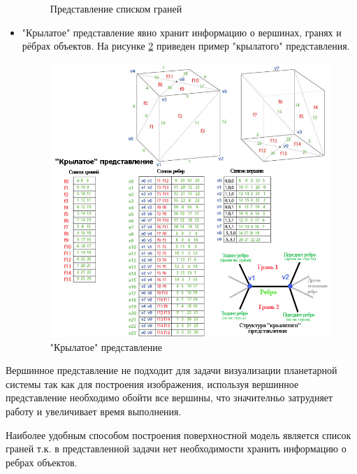 \begin{itemize}
\begin{figure}[H]
\begin{center}
		\end{center}
		\captionsetup{justification=centering}
		\caption{Представление списком граней}
		\label{img:grani}
	\end{figure}
	\item "Крылатое" представление явно хранит информацию о вершинах, гранях и рёбрах объектов.
		На рисунке \ref{img:kryl} приведен пример "крылатого" представления.
	\begin{figure}[H]
		\begin{center}
			\includegraphics[scale=0.5]{img/krylat.jpg}
		\end{center}
		\captionsetup{justification=centering}
		\caption{"Крылатое" представление}
		\label{img:kryl}
	\end{figure}
\end{itemize}


Вершинное представление не подходит для задачи визуализации планетарной системы так как для построения изображения, используя вершинное представление
необходимо обойти все вершины, что значителньо затрудняет работу и увеличивает время выполнения.

Наиболее удобным способом построения поверхностной модель является список граней т.к. в представленной задачи нет необходимости хранить информацию о ребрах объектов. 



